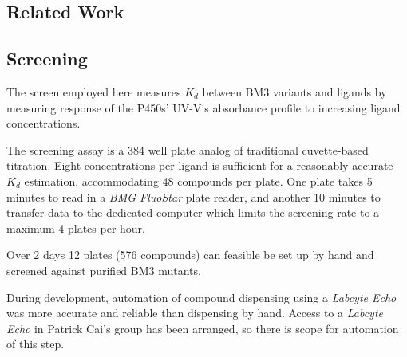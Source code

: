 \documentclass{article}
\begin{document}
\subsection{Related Work}

\subsection{Screening}
The screen employed here measures $K_{d}$ between BM3 variants and ligands by measuring response of the P450s' UV-Vis absorbance profile to increasing ligand concentrations. %
\par
The screening assay is a 384 well plate analog of traditional cuvette-based titration. Eight concentrations per ligand is sufficient for a reasonably accurate $K_d$ estimation, accommodating 48 compounds per plate. One plate takes 5 minutes to read in a \textit{BMG FluoStar} plate reader, and another 10 minutes to transfer data to the dedicated computer which limits the screening rate to a maximum 4 plates per hour. %
\par
Over 2 days 12 plates (576 compounds) can feasible be set up by hand and screened against purified BM3 mutants.   %
\par
During development, automation of compound dispensing using a \textit{Labcyte Echo} was more accurate and reliable than dispensing by hand. Access to a \textit{Labcyte Echo} in Patrick Cai's group has been arranged, so there is scope for automation of this step.  %
\end{document}
